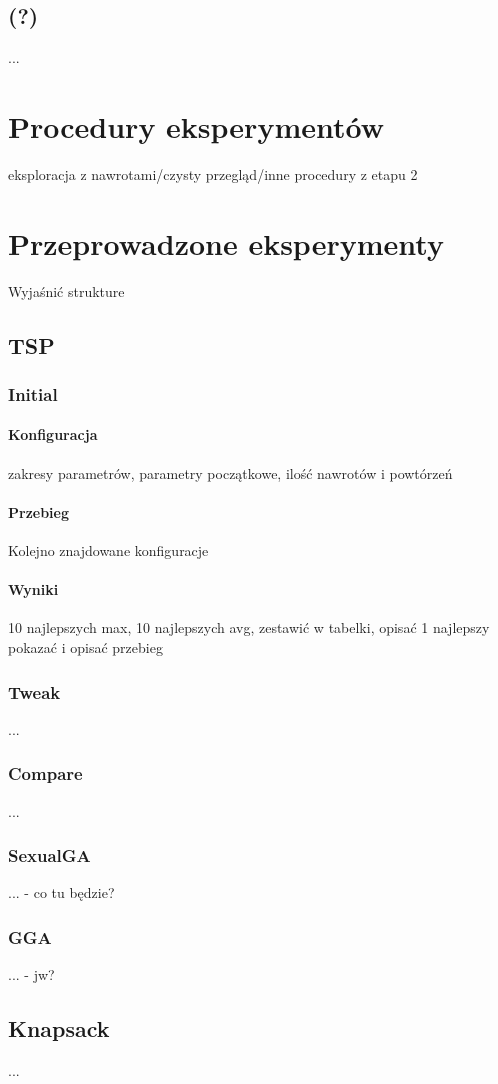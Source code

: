 \documentclass[twoside]{iisthesis}
\begin{document}
\subsection{(?)}
...
\section{Procedury eksperymentów}
eksploracja z nawrotami/czysty przegląd/inne procedury z etapu 2
\section{Przeprowadzone eksperymenty}
Wyjaśnić strukture
\subsection{TSP}
\subsubsection{Initial}
\paragraph{Konfiguracja}
zakresy parametrów, parametry początkowe, ilość nawrotów i powtórzeń
\paragraph{Przebieg}
Kolejno znajdowane konfiguracje
\paragraph{Wyniki}
10 najlepszych max, 10 najlepszych avg, zestawić w tabelki, opisać
1 najlepszy pokazać i opisać przebieg
\subsubsection{Tweak}
...
\subsubsection{Compare}
...
\subsubsection{SexualGA}
... - co tu będzie?
\subsubsection{GGA}
... - jw?
\subsection{Knapsack}
...
\end{document}
